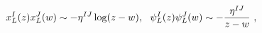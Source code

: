 \begin{equation}
x_L^I(z)x_L^J(w)\sim -\eta^{IJ}\log(z-w),~~
\psi_L^I(z)\psi_L^J(w)\sim -{\eta^{IJ}\over z-w} \ ,
\end{equation}

